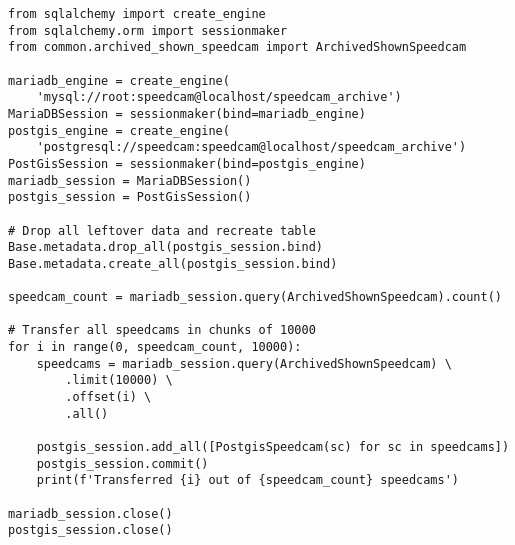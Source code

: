 \begin{code}
\begin{verbatim}
from sqlalchemy import create_engine
from sqlalchemy.orm import sessionmaker
from common.archived_shown_speedcam import ArchivedShownSpeedcam

mariadb_engine = create_engine(
    'mysql://root:speedcam@localhost/speedcam_archive')
MariaDBSession = sessionmaker(bind=mariadb_engine)
postgis_engine = create_engine(
    'postgresql://speedcam:speedcam@localhost/speedcam_archive')
PostGisSession = sessionmaker(bind=postgis_engine)
mariadb_session = MariaDBSession()
postgis_session = PostGisSession()

# Drop all leftover data and recreate table
Base.metadata.drop_all(postgis_session.bind)
Base.metadata.create_all(postgis_session.bind)

speedcam_count = mariadb_session.query(ArchivedShownSpeedcam).count()

# Transfer all speedcams in chunks of 10000
for i in range(0, speedcam_count, 10000):
    speedcams = mariadb_session.query(ArchivedShownSpeedcam) \
        .limit(10000) \
        .offset(i) \
        .all()
    
    postgis_session.add_all([PostgisSpeedcam(sc) for sc in speedcams])
    postgis_session.commit()
    print(f'Transferred {i} out of {speedcam_count} speedcams')

mariadb_session.close()
postgis_session.close()
\end{verbatim}
\label{lst:ToPostGIS}
\end{code}